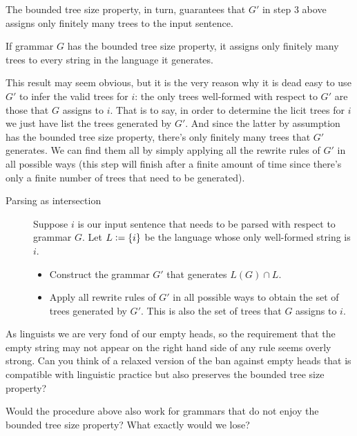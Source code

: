 The bounded tree size property, in turn, guarantees that $G'$ in step 3 above assigns only finitely many trees to the input sentence.
%
\begin{lemma}
    If grammar $G$ has the bounded tree size property, it assigns only finitely many trees to every string in the language it generates.
\end{lemma}
%
This result may seem obvious, but it is the very reason why it is dead easy to use $G'$ to infer the valid trees for $i$: the only trees well-formed with respect to $G'$ are those that $G$ assigns to $i$.
That is to say, in order to determine the licit trees for $i$ we just have list the trees generated by $G'$.
And since the latter by assumption has the bounded tree size property, there's only finitely many trees that $G'$ generates.
We can find them all by simply applying all the rewrite rules of $G'$ in all possible ways (this step will finish after a finite amount of time since there's only a finite number of trees that need to be generated).

\begin{description}
    \item[Parsing as intersection] Suppose $i$ is our input sentence that needs to be parsed with respect to grammar $G$.
        Let $L \mathrel{\mathop:}= \left \{ i \right \}$ be the language whose only well-formed string is $i$.
        \begin{itemize}
            \item Construct the grammar $G'$ that generates $L(G) \cap L$.
            \item Apply all rewrite rules of $G'$ in all possible ways to obtain the set of trees generated by $G'$.
                This is also the set of trees that $G$ assigns to $i$.
        \end{itemize}
\end{description}

\begin{exercise}
    As linguists we are very fond of our empty heads, so the requirement that the empty string may not appear on the right hand side of any rule seems overly strong.
    Can you think of a relaxed version of the ban against empty heads that is compatible with linguistic practice but also preserves the bounded tree size property?
\end{exercise}
%
\begin{exercise}
    Would the procedure above also work for grammars that do not enjoy the bounded tree size property?
    What exactly would we lose?
\end{exercise}

